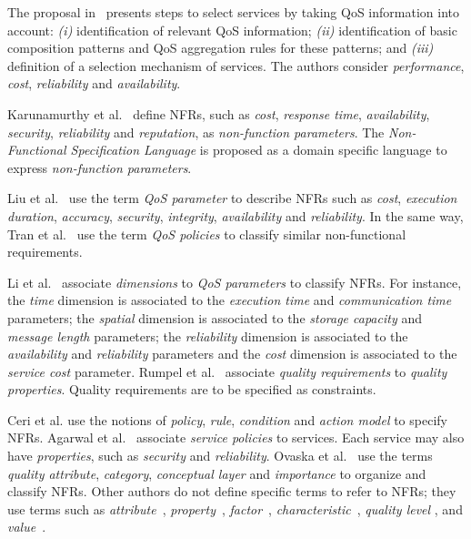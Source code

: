 \documentclass{singlecol-new}
\theoremstyle{TH}{
\newtheorem{lemma}{Lemma}
\newtheorem{theorem}[lemma]{Theorem}
\newtheorem{corrolary}[lemma]{Corrolary}
\newtheorem{conjecture}[lemma]{Conjecture}
\newtheorem{proposition}[lemma]{Proposition}
\newtheorem{claim}[lemma]{Claim}
\newtheorem{stheorem}[lemma]{Wrong Theorem}
\newtheorem{algorithm}{Algorithm}
}
\theoremstyle{THrm}{
\newtheorem{definition}{Definition}[section]
\newtheorem{question}{Question}[section]
\newtheorem{remark}{Remark}
\newtheorem{scheme}{Scheme}
}
\theoremstyle{THhit}{
\newtheorem{case}{Case}[section]
}
\theoremstyle{THhsl}{
\newtheorem{example}{Example}
}
\begin{document}
The proposal in~\cite{ThissenW06} presents steps to  select services
by taking QoS information into account:
\textit{(i)} identification of relevant QoS information;
\textit{(ii)} identification of basic composition patterns and
QoS aggregation rules for these patterns; and
\textit{(iii)} definition of a selection mechanism of services.
The authors consider  \textit{performance}, \textit{cost}, \textit{reliability} and
\textit{availability}.

Karunamurthy et al.~\cite{Karunamurthy2012787} define NFRs, such as \textit{cost}, \textit{response time}, \textit{availability}, \textit{security}, \textit{reliability} and \textit{reputation}, as  \textit{non-function parameters}.
The \textit{Non-Func\-tion\-al Specification Language} 
 is proposed as a domain specific language 
 to express \textit{non-function parameters}.

Liu et al.~\cite{Liu20121080} use the term \textit{QoS parameter} to describe NFRs such as \textit{cost}, \textit{execution duration}, \textit{accuracy}, \textit{security}, \textit{integrity}, \textit{availability} and \textit{reliability}.
In the same way, Tran et al.~\cite{Tran2012531} use the term \textit{QoS policies} to classify similar non-functional requirements.

Li et al.~\cite{Li2013} associate \textit{dimensions} to  \textit{QoS parameters} to classify NFRs.
For instance, the \textit{time} dimension is associated to the \textit{execution time} and \textit{communication time} parameters; the \textit{spatial} dimension is associated to the \textit{storage capacity} and \textit{message length} parameters; the \textit{reliability} dimension is associated to the \textit{availability} and \textit{reliability} parameters and the \textit{cost} dimension is associated to the \textit{service cost} parameter.
Rumpel et al.~\cite{Rumpel2012}  associate \textit{quality requirements} to  \textit{quality properties}. Quality requirements are to be specified as constraints.

Ceri et al.\cite{CeriDMF07} use the notions of \textit{policy}, \textit{rule}, \textit{condition} and \textit{action model} to specify NFRs.
Agarwal et al.~\cite{AgarwalLS09} associate \textit{service policies} to services.
Each service may also have \textit{properties}, such as \textit{security} and \textit{reliability}.
Ovaska et al.~\cite{OvaskaEHPA10} use the terms \textit{quality attribute}, \textit{category}, \textit{conceptual layer} and \textit{importance} to organize and classify NFRs.
Other authors do not define specific terms to refer to NFRs; they use terms such as \textit{attribute}~\cite{ZhangPSP05,BasinDL06,JeongCL09},
\textit{property}~\cite{Fabra2011},
\textit{factor}~\cite{MohantyRP10,GutierrezRF10},
\textit{characteristic}~\cite{DiamadopoulouMPS08},
\textit{qual\-i\-ty level} \cite{ModicaTV09}, and
\textit{value}~\cite{ThissenW06,BasinDL06}.
\end{document}

